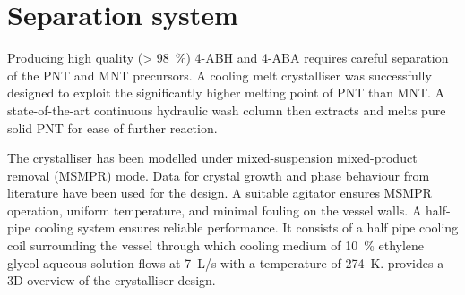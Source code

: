 \section*{Separation system}

Producing high quality (\SI{> 98}{\percent}) 4-ABH and 4-ABA requires careful separation of the PNT and MNT precursors. A cooling melt crystalliser was successfully designed to exploit the significantly higher melting point of PNT than MNT. A state-of-the-art continuous hydraulic wash column then extracts and melts pure solid PNT for ease of further reaction. 


The crystalliser has been modelled under mixed-suspension mixed-product removal (MSMPR) mode. Data for crystal growth and phase behaviour from literature have been used for the design. A suitable agitator ensures MSMPR operation, uniform temperature, and minimal fouling on the vessel walls. A half-pipe cooling system ensures reliable performance. It consists of a half pipe cooling coil surrounding the vessel through which cooling medium of \SI{10}{\percent} ethylene glycol aqueous solution flows at \SI{7}{L/s} with a temperature of \SI{274}{K}.  provides a 3D overview of the crystalliser design.


